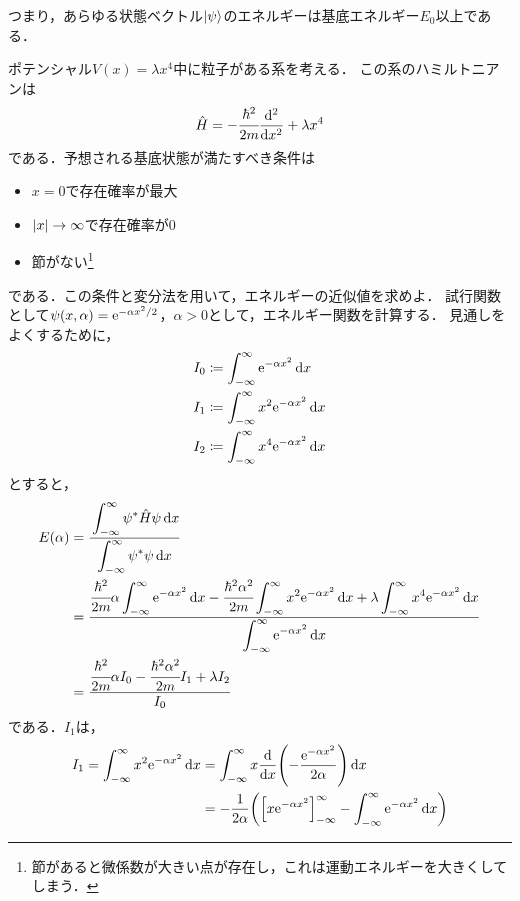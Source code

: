 \documentclass{report}
\begin{document}
  つまり，あらゆる状態ベクトル$\ket{\psi}$のエネルギーは基底エネルギー$E_0$以上である．
  \begin{myex}{}{}
    ポテンシャル$V(x)=\lambda x^4$中に粒子がある系を考える．
    この系のハミルトニアンは
    \begin{align}
      \hat{H} = -\cfrac{\hbar^2}{2m}\dv[2]{x} + \lambda x^4
    \end{align}
    である．予想される基底状態が満たすべき条件は
    \begin{itemize}
      \item $x = 0$で存在確率が最大
      \item $\abs{x} \to \infty$で存在確率が0
      \item 節がない\footnote{節があると微係数が大きい点が存在し，これは運動エネルギーを大きくしてしまう．}
    \end{itemize}
    である．この条件と変分法を用いて，エネルギーの近似値を求めよ．
    \tcblower
    試行関数として$\psi(x, \alpha) = \mathrm{e}^{-\alpha x^2/2}$，$\alpha > 0$として，エネルギー関数を計算する．
    見通しをよくするために，
    \begin{align}
      I_0 &\coloneqq \int_{-\infty}^{\infty}\mathrm{e}^{-\alpha x^2} \dd{x} \\ 
      I_1 &\coloneqq \int_{-\infty}^{\infty}x^2\mathrm{e}^{-\alpha x^2} \dd{x} \\ 
      I_2 &\coloneqq \int_{-\infty}^{\infty}x^4\mathrm{e}^{-\alpha x^2} \dd{x} 
    \end{align}
    とすると，
    \begin{align}
      E(\alpha) &= \cfrac{\displaystyle\int_{-\infty}^{\infty} \psi^{*}\hat{H}\psi \dd{x}}{\displaystyle\int_{-\infty}^{\infty} \psi^{*}\psi \dd{x}} \\ 
      &= \frac{\displaystyle \cfrac{\hbar^2}{2m}\alpha\int_{-\infty}^{\infty}\mathrm{e}^{-\alpha x^2}\dd{x} -\cfrac{\hbar^2\alpha^2}{2m}\int_{-\infty}^{\infty}x^2\mathrm{e}^{-\alpha x^2} \dd{x} + \lambda\int_{-\infty}^{\infty}x^4\mathrm{e}^{-\alpha x^2}\dd{x}}{\displaystyle\int_{-\infty}^{\infty}\mathrm{e}^{-\alpha x^2}\dd{x}} \\
      &= \frac{\cfrac{\hbar^2}{2m}\alpha I_0 - \cfrac{\hbar^2\alpha^2}{2m}I_1 + \lambda I_2}{I_0}\label{E1}
    \end{align}
    である．$I_1$は，
    \begin{align}
      I_1 = \int_{-\infty}^{\infty}x^2\e^{-\alpha x^2}\dd{x} &= \int_{-\infty}^{\infty}x\dv{x}\qty(-\frac{\e^{-\alpha x^2}}{2\alpha}) \dd{x} \\ 
      &= -\frac{1}{2\alpha}\qty(\qty[x\e^{-\alpha x^2}]_{-\infty}^{\infty} - \int_{-\infty}^{\infty}\e^{-\alpha x^2}\dd{x}) \\ 

\end{align}
\end{myex}
\end{document}
